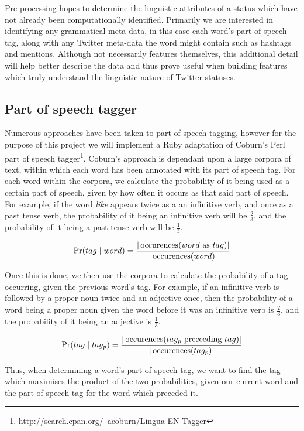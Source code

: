 Pre-processing hopes to determine the linguistic attributes of a status which have not already been computationally identified. Primarily we are interested in identifying any grammatical meta-data, in this case each word's part of speech tag, along with any Twitter meta-data the word might contain such as hashtags and mentions. Although not necessarily features themselves, this additional detail will help better describe the data and thus prove useful when building features which truly understand the linguistic nature of Twitter statuses.

\subsection{Part of speech tagger}

Numerous approaches have been taken to part-of-speech tagging, however for the purpose of this project we will implement a Ruby adaptation of Coburn's Perl part of speech tagger\footnote{http\-://\-search\-.cpan\-.org\-/~\-acoburn\-/Lingua\--EN\--Tagger}. Coburn's approach is dependant upon a large corpora of text, within which each word has been annotated with its part of speech tag. For each word within the corpora, we calculate the probability of it being used as a certain part of speech, given by how often it occurs as that said part of speech. For example, if the word \emph{like} appears twice as a an infinitive verb, and once as a past tense verb, the probability of it being an infinitive verb will be $\frac{2}{3}$, and the probability of it being a past tense verb will be $\frac{1}{3}$.

\begin{equation}
	\Pr(tag \mid word) = \frac{|\operatorname*{occurences}(word \text{ as } tag)|}{|\operatorname*{occurences}(word)|}
\end{equation}

Once this is done, we then use the corpora to calculate the probability of a tag occurring, given the previous word's tag. For example, if an infinitive verb is followed by a proper noun twice and an adjective once, then the probability of a word being a proper noun given the word before it was an infinitive verb is $\frac{2}{3}$, and the probability of it being an adjective is $\frac{1}{3}$.

\begin{equation}
	\Pr(tag \mid tag_{p}) = \frac{|\operatorname*{occurences}(tag_{p} \text{ preceeding } tag)|}{|\operatorname*{occurences}(tag_p)|}
\end{equation}

Thus, when determining a word's part of speech tag, we want to find the tag which maximises the product of the two probabilities, given our current word and the part of speech tag for the word which preceded it.

